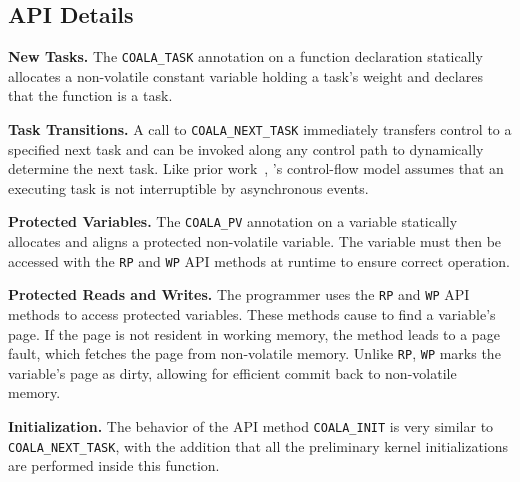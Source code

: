\subsection{API Details}

\textbf{New Tasks.} The \texttt{COALA\_TASK} annotation on a function
declaration statically allocates a non-volatile constant variable holding a
task's weight and declares that the function is a task.

\textbf{Task Transitions.} A call to \texttt{COALA\_NEXT\_TASK} immediately
transfers control to a specified next task and can be invoked along
any control path to dynamically determine the next task.
Like prior work~\cite{chain,dino,ratchet}, \sys's control-flow model
assumes that an executing task is not interruptible by asynchronous events.  

\textbf{Protected Variables.} The \texttt{COALA\_PV} annotation on a
variable statically allocates and aligns a protected non-volatile variable. The
variable must then be accessed with the \texttt{RP} and \texttt{WP} API methods at
runtime to ensure correct operation.

\textbf{Protected Reads and Writes.} The programmer uses the \texttt{RP} and \texttt{WP} API
methods to access protected variables.  These methods cause \sys to find a variable's page.
If the page is not resident in working memory, the method leads to a page fault,
which fetches the page from non-volatile memory. Unlike \texttt{RP},
\texttt{WP} marks the variable's page as dirty, allowing for efficient 
commit back to non-volatile memory. 

\textbf{Initialization.} The behavior of the API method
\texttt{COALA\_INIT} is very similar to \texttt{COALA\_NEXT\_TASK}, with the
addition that all the preliminary kernel initializations are performed inside
this function. 



